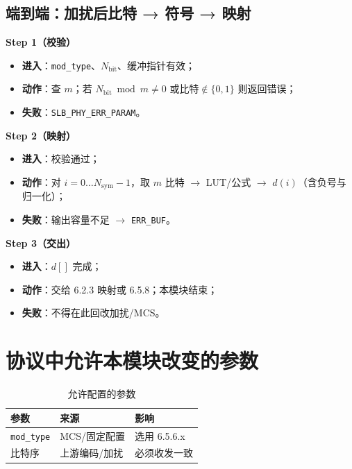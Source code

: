 \documentclass[11pt,a4paper]{ctexart}
\begin{document}
\subsection{端到端：加扰后比特 → 符号 → 映射}

\textbf{Step 1（校验）}
\begin{itemize}[nosep]
  \item \textbf{进入}：\texttt{mod\_type}、$N_{\mathrm{bit}}$、缓冲指针有效；
  \item \textbf{动作}：查 $m$；若 $N_{\mathrm{bit}}\bmod m\neq 0$ 或比特$\notin\{0,1\}$ 则返回错误；
  \item \textbf{失败}：\texttt{SLB\_PHY\_ERR\_PARAM}。
\end{itemize}

\textbf{Step 2（映射）}
\begin{itemize}[nosep]
  \item \textbf{进入}：校验通过；
  \item \textbf{动作}：对 $i{=}0\ldots N_{\mathrm{sym}}{-}1$，取 $m$ 比特 $\rightarrow$ LUT/公式 $\rightarrow$ $d(i)$（含负号与归一化）；
  \item \textbf{失败}：输出容量不足 $\rightarrow$ \texttt{ERR\_BUF}。
\end{itemize}

\textbf{Step 3（交出）}
\begin{itemize}[nosep]
  \item \textbf{进入}：$d[]$ 完成；
  \item \textbf{动作}：交给 6.2.3 映射或 6.5.8；本模块结束；
  \item \textbf{失败}：不得在此回改加扰/MCS。
\end{itemize}

\section{协议中允许本模块改变的参数}

\begin{longtable}{L{4cm}L{4cm}L{6cm}}
\caption{允许配置的参数\label{tab:656-tunable}} \\
\toprule
\textbf{参数} & \textbf{来源} & \textbf{影响} \\
\midrule
\texttt{mod\_type} & MCS/固定配置 & 选用 6.5.6.x \\
比特序 & 上游编码/加扰 & 必须收发一致 \\
\bottomrule
\end{longtable}
\end{document}
